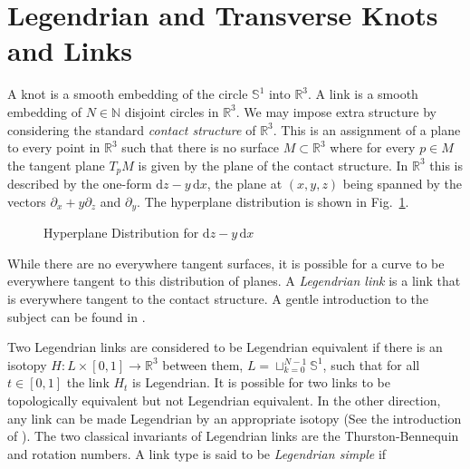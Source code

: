 \documentclass{article}
\theoremstyle{plain}
\begin{document}
    \section{Legendrian and Transverse Knots and Links}
        A knot is a smooth embedding of the circle $\mathbb{S}^{1}$ into
        $\mathbb{R}^{3}$. A link is a smooth embedding of $N\in\mathbb{N}$
        disjoint circles in $\mathbb{R}^{3}$. We may impose
        extra structure by considering the standard \textit{contact structure}
        of $\mathbb{R}^{3}$. This is an assignment
        of a plane to every point in $\mathbb{R}^{3}$ such that there is no
        surface $M\subset\mathbb{R}^{3}$ where for every $p\in{M}$ the tangent
        plane $T_{p}M$ is given by the plane of the contact structure. In
        $\mathbb{R}^{3}$ this is described by the one-form
        $\textrm{d}z-y\,\textrm{d}x$, the plane at $(x,y,z)$ being spanned by
        the vectors $\partial_{x}+y\partial_{z}$ and $\partial_{y}$. The
        hyperplane distribution is shown in Fig.~\ref{fig:darboux_form_001}.
        \begin{figure}
            \centering
            \caption{Hyperplane Distribution for $\textrm{d}z-y\,\textrm{d}x$}
            \label{fig:darboux_form_001}
        \end{figure}
        While there are no everywhere tangent surfaces, it is possible for a
        curve to be everywhere tangent to this distribution of planes.
        A \textit{Legendrian link} is a link that is everywhere tangent to
        the contact structure. A gentle introduction to the subject can be found
        in \cite{JoshuaMSabloffWhatIsLegendrianKnot}.
        \par\hfill\par
        Two Legendrian links are considered to be Legendrian equivalent if
        there is an isotopy $H:L\times[0,1]\rightarrow\mathbb{R}^{3}$ between
        them, $L=\sqcup_{k=0}^{N-1}\mathbb{S}^{1}$, such that for all
        $t\in[0,1]$ the link $H_{t}$ is Legendrian. It is possible for two links
        to be topologically equivalent but not Legendrian equivalent. In the other
        direction, any link can be made Legendrian by an appropriate isotopy
        (See the introduction of \cite{VeraVertessiTransNonSimpleKnots}). The
        two classical invariants of Legendrian links are the Thurston-Bennequin
        and rotation numbers.
        A link type is said to be \textit{Legendrian simple} if
\end{document}
